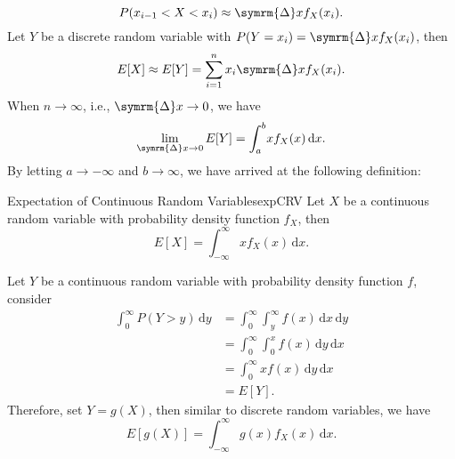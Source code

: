 \documentclass[math]{amznotes}
\theoremstyle{remark}
\begin{document}
\begin{equation*}
    P(x_{i - 1} < X < x_i) \approx \symrm{\Delta}xf_X(x_i).
\end{equation*}
Let $Y$ be a discrete random variable with $P(Y = x_i) = \symrm{\Delta}xf_X(x_i)$, then 
\begin{equation*}
    E[X] \approx E[Y] = \sum_{i = 1}^{n}x_i\symrm{\Delta}xf_X(x_i).
\end{equation*}
When $n \to \infty$, i.e., $\symrm{\Delta}x \to 0$, we have
\begin{equation*}
    \lim_{\symrm{\Delta}x \to 0}E[Y] = \int_{a}^{b}\!xf_X(x)\,\mathrm{d}x.
\end{equation*}
By letting $a \to -\infty$ and $b \to \infty$, we have arrived at the following definition:
\begin{dfnbox}{Expectation of Continuous Random Variables}{expCRV}
    Let $X$ be a continuous random variable with probability density function $f_X$, then
    \begin{equation*}
        E[X] = \int_{-\infty}^{\infty}\!xf_X(x)\,\mathrm{d}x.
    \end{equation*}
\end{dfnbox}
Let $Y$ be a continuous random variable with probability density function $f$, consider
\begin{align*}
    \int_{0}^{\infty}\!P(Y > y)\,\mathrm{d}y & = \int_{0}^{\infty}\!\int_{y}^{\infty}\!f(x)\,\mathrm{d}x\,\mathrm{d}y \\
    & = \int_{0}^{\infty}\!\int_{0}^{x}\!f(x)\,\mathrm{d}y\,\mathrm{d}x \\ 
    & = \int_{0}^{\infty}\!xf(x)\,\mathrm{d}y\,\mathrm{d}x \\ 
    & = E[Y].
\end{align*}
Therefore, set $Y = g(X)$, then similar to discrete random variables, we have
\begin{equation*}
    E\left[g(X)\right] = \int_{-\infty}^{\infty}\!g(x)f_X(x)\,\mathrm{d}x.
\end{equation*}
\end{document}
